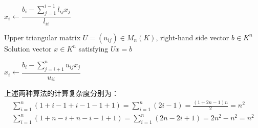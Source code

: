 \begin{method}
\begin{algorithm}[H]
\begin{algorithmic}[1]
				\State $x_i \gets \dfrac{b_i - \sum\limits_{j=1}^{i-1} l_{ij}x_j}{l_{ii}}$
			\EndFor
		\end{algorithmic}
	\end{algorithm}
	\begin{algorithm}[H]
		\caption{Backward Substitution for Upper Triangular Systems}
		\label{alg:BackwardSubstitution}
		\begin{algorithmic}[1]
			\Require Upper triangular matrix $U=(u_{ij})\in M_{n}(K)$, right-hand side vector $b\in K^n$
			\Ensure Solution vector $x\in K^n$ satisfying $Ux=b$
			
				\State $x_i \gets \dfrac{b_i - \sum\limits_{j=i+1}^{n} u_{ij}x_j}{u_{ii}}$
			\EndFor
		\end{algorithmic}
	\end{algorithm}\par
	上述两种算法的计算复杂度分别为：
	\begin{gather*}
		\sum_{i=1}^{n}(1+i-1+i-1-1+1)=\sum_{i=1}^{n}(2i-1)=\frac{(1+2n-1)n}{2}=n^2 \\
		\sum_{i=1}^{n}(1+n-i+n-i-1+1)=\sum_{i=1}^{n}(2n-2i+1)=2n^2-n^2=n^2
	\end{gather*}
\end{method}

